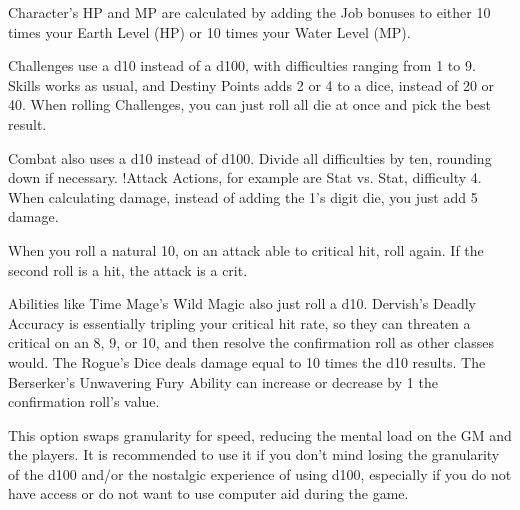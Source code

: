 Character’s HP and MP are calculated by
adding the Job bonuses to either 10 times your
Earth Level (HP) or 10 times your Water Level
(MP).

Challenges use a d10 instead of a d100,
with difficulties ranging from 1 to 9. Skills works
as usual, and Destiny Points adds 2 or 4 to a dice,
instead of 20 or 40. When rolling Challenges, you
can just roll all die at once and pick the best result.

Combat also uses a d10 instead of d100.
Divide all difficulties by ten, rounding down if
necessary. !Attack Actions, for example are Stat
vs. Stat, difficulty 4. When calculating damage,
instead of adding the 1's digit die, you just add 5
damage.

When you roll a natural 10, on an attack
able to critical hit, roll again. If the second roll is
a hit, the attack is a crit.

Abilities like Time Mage’s Wild Magic
also just roll a d10. Dervish's Deadly Accuracy is
essentially tripling your critical hit rate, so they
can threaten a critical on an 8, 9, or 10, and then
resolve the confirmation roll as other classes
would. The Rogue’s Dice deals damage equal to
10 times the d10 results. The Berserker’s
Unwavering Fury Ability can increase or
decrease by 1 the confirmation roll’s value.

This option swaps granularity for speed,
reducing the mental load on the GM and the
players. It is recommended to use it if you don’t
mind losing the granularity of the d100 and/or
the nostalgic experience of using d100, especially
if you do not have access or do not want to use
computer aid during the game.